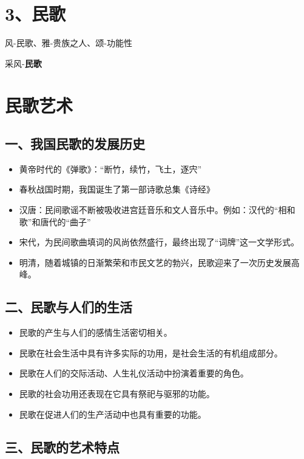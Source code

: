 \documentclass[
]{article}
\providecommand{\tightlist}{%
  \setlength{\itemsep}{0pt}\setlength{\parskip}{0pt}}
\begin{document}
\section{3、民歌}\label{ux6c11ux6b4c}

风-民歌、雅-贵族之人、颂-功能性

采风-\textbf{民歌}

\section{民歌艺术}\label{ux6c11ux6b4cux827aux672f}

\subsection{一、我国民歌的发展历史}\label{ux4e00ux6211ux56fdux6c11ux6b4cux7684ux53d1ux5c55ux5386ux53f2}

\begin{itemize}
\tightlist
\item
  黄帝时代的《弹歌》：``断竹，续竹，飞土，逐宍''
\item
  春秋战国时期，我国诞生了第一部诗歌总集《诗经》
\item
  汉唐：民间歌谣不断被吸收进宫廷音乐和文人音乐中。例如：汉代的``相和歌''和唐代的``曲子''
\item
  宋代，为民间歌曲填词的风尚依然盛行，最终出现了``词牌''这一文学形式。
\item
  明清，随着城镇的日渐繁荣和市民文艺的勃兴，民歌迎来了一次历史发展高峰。
\end{itemize}

\subsection{二、民歌与人们的生活}\label{ux4e8cux6c11ux6b4cux4e0eux4ebaux4eecux7684ux751fux6d3b}

\begin{itemize}
\tightlist
\item
  民歌的产生与人们的感情生活密切相关。
\item
  民歌在社会生活中具有许多实际的功用，是社会生活的有机组成部分。
\item
  民歌在人们的交际活动、人生礼仪活动中扮演着重要的角色。
\item
  民歌的社会功用还表现在它具有祭祀与驱邪的功能。
\item
  民歌在促进人们的生产活动中也具有重要的功能。
\end{itemize}

\subsection{三、民歌的艺术特点}\label{ux4e09ux6c11ux6b4cux7684ux827aux672fux7279ux70b9}
\end{document}
